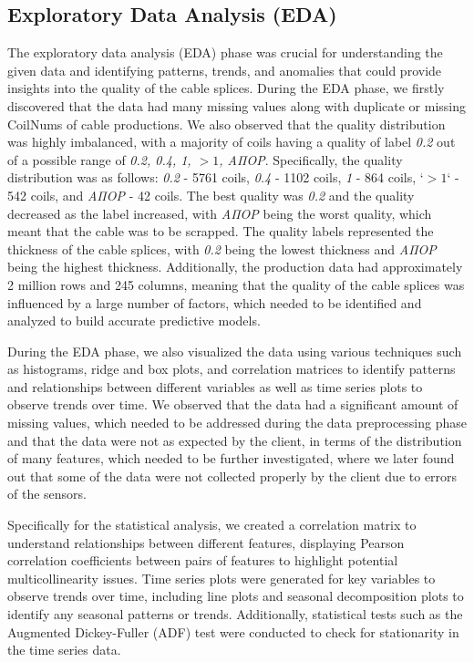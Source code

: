 \subsection{Exploratory Data Analysis (EDA)}

The exploratory data analysis (EDA) phase was crucial for understanding the
given data and identifying patterns, trends, and anomalies that could provide
insights into the quality of the cable splices. During the EDA phase, we
firstly discovered that the data had many missing values along with duplicate
or missing CoilNums of cable productions. We also observed that the quality
distribution was highly imbalanced, with a majority of coils having a quality
of label \emph{0.2} out of a possible range of \emph{0.2, 0.4, 1, $>1$, ΑΠΟΡ}.
Specifically, the quality distribution was as follows: \emph{0.2} - 5761 coils,
\emph{0.4} - 1102 coils, \emph{1} - 864 coils, `\emph{$>1$}` - 542 coils, and
\emph{ΑΠΟΡ} - 42 coils. The best quality was \emph{0.2} and the quality
decreased as the label increased, with \emph{ΑΠΟΡ} being the worst quality,
which meant that the cable was to be scrapped. The quality labels represented
the thickness of the cable splices, with \emph{0.2} being the lowest thickness
and \emph{ΑΠΟΡ} being the highest thickness. Additionally, the production data
had approximately 2 million rows and 245 columns, meaning that the quality of
the cable splices was influenced by a large number of factors, which needed to
be identified and analyzed to build accurate predictive models.

During the EDA phase, we also visualized the data using various techniques such
as histograms, ridge and box plots, and correlation matrices to identify
patterns and relationships between different variables as well as time series
plots to observe trends over time. We observed that the data had a significant
amount of missing values, which needed to be addressed during the data
preprocessing phase and that the data were not as expected by the client, in
terms of the distribution of many features, which needed to be further
investigated, where we later found out that some of the data were not collected
properly by the client due to errors of the sensors.

Specifically for the statistical analysis, we created a correlation matrix to
understand relationships between different features, displaying Pearson
correlation coefficients between pairs of features to highlight potential
multicollinearity issues. Time series plots were generated for key variables to
observe trends over time, including line plots and seasonal decomposition plots
to identify any seasonal patterns or trends. Additionally, statistical tests
such as the Augmented Dickey-Fuller (ADF) test were conducted to check for
stationarity in the time series data.

